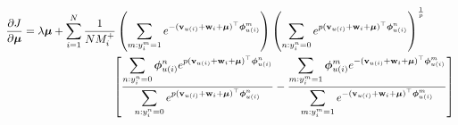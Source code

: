 \begin{equation*}
\begin{aligned}
%
\frac{\partial J}{\partial \mubm}
&= \lambda \mubm
  + \sum_{i=1}^N \frac{1}{N M_i^+} 
    \left( \sum_{m: y_i^m = 1} e^{-(\bv_{u(i)} + \w_i + \mubm)^\top \phibm_{u(i)}^m} \right)
    \left( \sum_{n: y_i^n = 0} e^{p (\bv_{u(i)} + \w_i + \mubm)^\top \phibm_{u(i)}^n} \right)^\frac{1}{p} \\
& \hspace{8em} \left[ 
    \frac{ \displaystyle \sum_{n: y_i^n = 0} \phibm_{u(i)}^n e^{p (\bv_{u(i)} + \w_i + \mubm)^\top \phibm_{u(i)}^n} }
         { \displaystyle \sum_{n: y_i^n = 0} e^{p (\bv_{u(i)} + \w_i + \mubm)^\top \phibm_{u(i)}^n} }
    - \frac{ \displaystyle \sum_{m: y_i^m = 1} \phibm_{u(i)}^m e^{-(\bv_{u(i)} + \w_i + \mubm)^\top \phibm_{u(i)}^m} }
           { \displaystyle \sum_{m: y_i^m = 1} e^{-(\bv_{u(i)} + \w_i + \mubm)^\top \phibm_{u(i)}^m} } \right]
\end{aligned}
\end{equation*}
